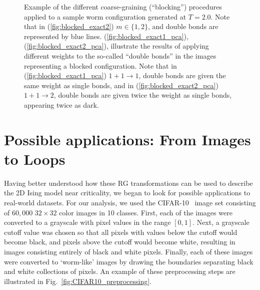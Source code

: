 \documentclass[../main.tex]{subfiles}
\begin{document}
\begin{figure}[htpb]
    \centering
    \hfill
    \centering
    \hfill
    \hfill
    \caption{Example of the different coarse-graining (``blocking'') procedures
      applied to a sample worm configuration generated at $T = 2.0$. Note that
      in (\ref{fig:blocked_exact2}) $m \in \{1, 2\}$, and double bonds are
      represented by blue lines.  (\ref{fig:blocked_exact1_pca}),
      (\ref{fig:blocked_exact2_pca}), illustrate the results of applying
      different weights to the so-called ``double bonds'' in the images
      representing a blocked configuration. Note that in
      (\ref{fig:blocked_exact1_pca}) $1+1\rightarrow 1$, double bonds are given
      the same weight as single bonds, and in (\ref{fig:blocked_exact2_pca})
    $1+1\rightarrow 2$, double bonds are given twice the weight as single
  bonds, appearing twice as dark.}\label{fig:double_bond_weights}%
\label{fig:alt_blockings}
\end{figure}
%
%
\section{Possible applications: From Images to Loops}%
\label{sec:cifar} Having better understood how these RG transformations can be
used to describe the 2D Ising model near criticality, we began to look for
possible applications to real-world datasets. For our analysis, we used the
CIFAR-10~\cite{Krizhevsky09} image set consisting of $60,000$ $32\times32$
color images in 10 classes. First, each of the images were converted to a
grayscale with pixel values in the range $[0, 1]$. Next, a grayscale cutoff
value was chosen so that all pixels with values below the cutoff would become
black, and pixels above the cutoff would become white, resulting in images
consisting entirely of black and white pixels. Finally, each of these images
were converted to `worm-like' images by drawing the boundaries separating black
and white collections of pixels. An example of these preprocessing steps are
illustrated in Fig.~\ref{fig:CIFAR10_preprocessing}.
%
\end{document}
